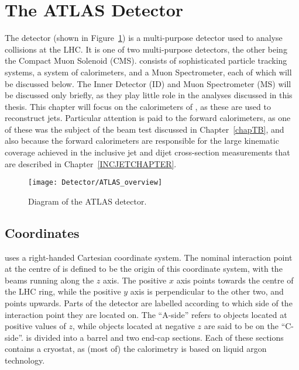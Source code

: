 %
%


\section{The ATLAS Detector}
The \atlas detector\cite{detector_paper} (shown in Figure~\ref{fig_ATLAS}) is a multi-purpose detector used to analyse collisions at the LHC. It is one of two multi-purpose detectors, the other being the Compact Muon Solenoid (CMS)\cite{CMSdetector}. \atlas consists of sophisticated particle tracking systems, a system of calorimeters, and a Muon Spectrometer, each of which will be discussed below. The Inner Detector (ID) and Muon Spectrometer (MS) will be discussed only briefly, as they play little role in the analyses discussed in this thesis. This chapter will focus on the calorimeters of \atlas, as these are used to reconstruct jets. Particular attention is paid to the forward calorimeters, as one of these was the subject of the beam test discussed in Chapter~\ref{chapTB}, and also because the forward calorimeters are responsible for the large kinematic coverage achieved in the inclusive jet and dijet cross-section measurements that are described in Chapter~\ref{INCJETCHAPTER}.
\begin{figure}[tb]
\begin{center}
\texttt{[image: Detector/ATLAS\_overview]}
\end{center}
\caption{Diagram of the ATLAS detector.}
\label{fig_ATLAS}
\end{figure}

\subsection{Coordinates}

\atlas uses a right-handed Cartesian coordinate system. The nominal interaction point at the centre of \atlas is defined to be the origin of this coordinate system, with the beams running along the $z$ axis. The positive $x$ axis points towards the centre of the LHC ring, while the positive $y$ axis is perpendicular to the other two, and points upwards. Parts of the detector are labelled according to which side of the interaction point they are located on. The ``A-side'' refers to objects located at positive values of $z$, while objects located at negative $z$ are said to be on the ``C-side''. \atlas is divided into a barrel and two end-cap sections. Each of these sections contains a cryostat, as (most of) the \atlas calorimetry is based on liquid argon technology.



